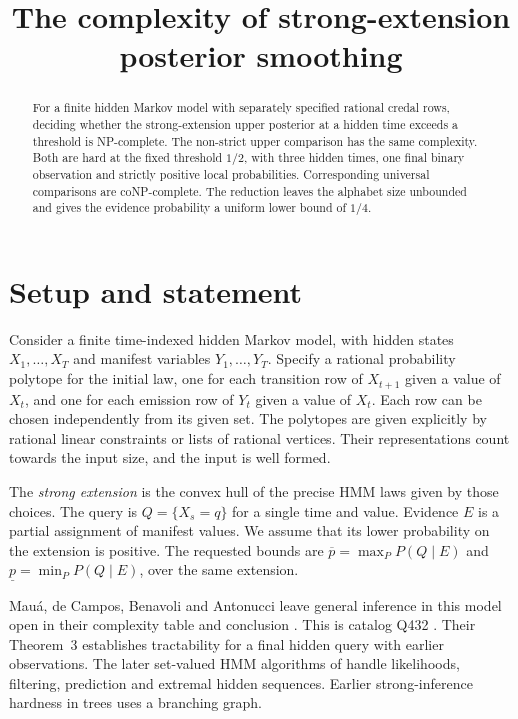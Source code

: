 \documentclass[11pt,a4paper]{amsart}
\title{The complexity of strong-extension posterior smoothing}
\date{}
\begin{document}
\begin{abstract}
For a finite hidden Markov model with separately specified rational
credal rows, deciding whether the strong-extension upper posterior
at a hidden time exceeds a threshold is NP-complete. The non-strict
upper comparison has the same complexity. Both are hard at the fixed
threshold \(1/2\), with three hidden times, one final binary
observation and strictly positive local probabilities. Corresponding
universal comparisons are coNP-complete. The reduction leaves the
alphabet size unbounded and gives the evidence probability a uniform
lower bound of \(1/4\).
\end{abstract}
\maketitle

\section{Setup and statement}

Consider a finite time-indexed hidden Markov model, with hidden
states \(X_1,\ldots,X_T\) and manifest variables \(Y_1,\ldots,Y_T\).
Specify a rational probability polytope for the initial law, one
for each transition row of \(X_{t+1}\) given a value of \(X_t\),
and one for each emission row of \(Y_t\) given a value of \(X_t\).
Each row can be chosen independently from its given set. The
polytopes are given explicitly by rational linear constraints
or lists of rational vertices. Their representations count
towards the input size, and the input is well formed.

The \emph{strong extension} is the convex hull of the precise
HMM laws given by those choices. The query is \(Q=\{X_s=q\}\)
for a single time and value. Evidence \(E\) is a partial
assignment of manifest values. We assume that its lower
probability on the extension is positive. The requested
bounds are \(\overline p=\max_P P(Q\mid E)\) and
\(\underline p=\min_P P(Q\mid E)\), over the same extension.

Mau\'a, de Campos, Benavoli and Antonucci leave general inference
in this model open in their complexity table and conclusion
\cite{maua}. This is catalog Q432 \cite{catalog}.
Their Theorem~3 establishes tractability for a final hidden
query with earlier observations. The later set-valued HMM
algorithms of \cite{setvalued} handle likelihoods, filtering,
prediction and extremal hidden sequences. Earlier strong-inference
hardness in trees \cite[Theorem~2]{maua} uses a branching graph.
\end{document}
